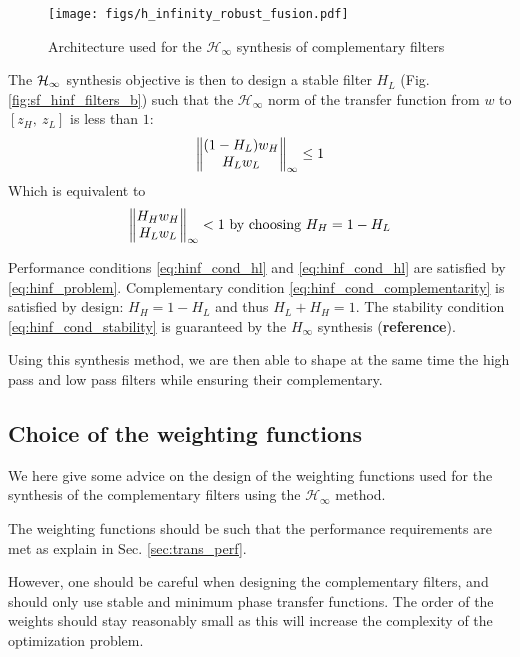 \documentclass[9pt, technote, a4paper]{ieeeconf}
\begin{document}
\begin{figure}[htbp]
\centering
\texttt{[image: figs/h\_infinity\_robust\_fusion.pdf]}
\caption{\label{fig:h_infinity_robust_fusion}
Architecture used for the \(\mathcal{H}_\infty\) synthesis of complementary filters}
\end{figure}

The \(\mathcal{H}_\infty\) synthesis objective is then to design a stable filter \(H_L\) (Fig. \ref{fig:sf_hinf_filters_b}) such that the \(\mathcal{H}_\infty\) norm of the transfer function from \(w\) to \([z_H, \ z_L]\) is less than \(1\):
\begin{equation}
  \left\|\begin{matrix} (1 - H_L) w_H \\ H_L w_L \end{matrix}\right\|_{\infty} \le 1
\end{equation}
Which is equivalent to
\begin{equation}
\label{eq:hinf_problem}
  \left\|\begin{matrix} H_H w_H \\ H_L w_L \end{matrix}\right\|_{\infty} < 1 \text{ by choosing } H_H = 1 - H_L
\end{equation}

Performance conditions \eqref{eq:hinf_cond_hl} and \eqref{eq:hinf_cond_hl} are satisfied by \eqref{eq:hinf_problem}.
Complementary condition \eqref{eq:hinf_cond_complementarity} is satisfied by design: \(H_H = 1 - H_L\) and thus \(H_L + H_H = 1\).
The stability condition \eqref{eq:hinf_cond_stability} is guaranteed by the \(H_\infty\) synthesis (\textbf{reference}).


Using this synthesis method, we are then able to shape at the same time the high pass and low pass filters while ensuring their complementary.

\subsection{Choice of the weighting functions}
\label{sec:org6167188}
\label{sec:hinf_weighting_func}

We here give some advice on the design of the weighting functions used for the synthesis of the complementary filters using the \(\mathcal{H}_\infty\) method.

The weighting functions should be such that the performance requirements are met as explain in Sec. \ref{sec:trans_perf}.

However, one should be careful when designing the complementary filters, and should only use stable and minimum phase transfer functions.
The order of the weights should stay reasonably small as this will increase the complexity of the optimization problem.
\end{document}
